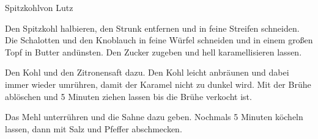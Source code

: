 \begin{recipe}{Spitzkohl}{von Lutz}
  \label{Spitzkohl}
  \inglist

  \steps
  Den Spitzkohl halbieren, den Strunk entfernen und in feine Streifen
  schneiden.  Die Schalotten und den Knoblauch in feine Würfel schneiden und in
  einem großen Topf in Butter andünsten. Den Zucker zugeben und hell
  karamellisieren lassen.

  Den Kohl und den Zitronensaft dazu. Den Kohl leicht anbräunen und dabei immer
  wieder umrühren, damit der Karamel nicht zu dunkel wird. Mit der Brühe
  ablöschen und 5 Minuten ziehen lassen bis die Brühe verkocht ist.

  Das Mehl unterrühren und die Sahne dazu geben. Nochmals 5 Minuten köcheln
  lassen, dann mit Salz und Pfeffer abschmecken.

\end{recipe}
